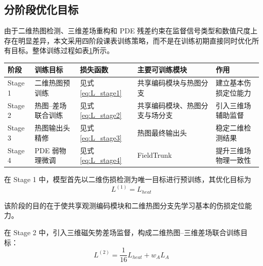 \subsection{分阶段优化目标}
\label{subsec:stage_objectives}

由于二维热图检测、三维差场重构和 PDE 残差约束在监督信号类型和数值尺度上存在明显差异，本文采用四阶段课表训练策略，而不是在训练初期直接同时优化所有目标\citep{wang2021survey}。整体训练过程如表\ref{tab:stage_training_strategy}所示。

\begin{table}[htbp]
\centering
\small
{}
\label{tab:stage_training_strategy}
\renewcommand{\arraystretch}{1.25}
\begin{tabularx}{\textwidth}{
>{\centering\arraybackslash}p{1.4cm}|
>{\centering\arraybackslash}p{2.5cm}|
>{\centering\arraybackslash}p{2.5cm}|
>{\centering\arraybackslash}p{3.2cm}|
>{\centering\arraybackslash}X}
\hline
阶段 & 训练目标 & 损失函数 & 主要可训练模块 & 作用 \\
\hline
Stage 1 
& 二维热图预训练 
& 见式 \eqref{eq:L_stage1} 
& 共享编码模块与热图分支 
& 建立基本伤损定位能力 \\

Stage 2 
& 热图--差场联合训练 
& 见式 \eqref{eq:L_stage2} 
& 共享编码模块、热图分支与场分支 
& 引入三维场辅助监督 \\

Stage 3 
& 热图输出头精修 
& 见式 \eqref{eq:L_stage3} 
& 热图最终输出头 
& 稳定二维检测结果 \\

Stage 4 
& PDE 弱物理微调 
& 见式 \eqref{eq:L_stage4} 
& FieldTrunk 
& 提升三维场物理一致性 \\
\hline
\end{tabularx}
\end{table}

在 Stage 1 中，模型首先以二维伤损检测为唯一目标进行预训练，其优化目标为
\begin{equation}
\label{eq:L_stage1}
L^{(1)}
=
L_{heat}
\end{equation}

该阶段的目的在于使共享观测编码模块和二维热图分支先学习基本的伤损定位能力。

在 Stage 2 中，引入三维磁矢势差场监督，构成二维热图--三维差场联合训练目标：
\begin{equation}
\label{eq:L_stage2}
L^{(2)}
=
\frac{1}{16}L_{heat}
+
w_A L_A
\end{equation}

